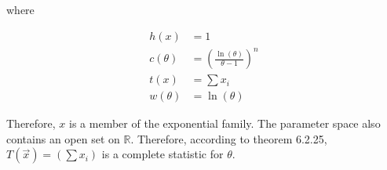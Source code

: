 where

\begin{align*}
	h(x) &= 1 \\
	c(\theta) &= \left( \frac{\ln(\theta)}{\theta-1} \right)^n \\
	t(x) &= \sum x_i \\
	w(\theta) &= \ln(\theta)
\end{align*}

Therefore, $x$ is a member of the exponential family. The parameter space also contains an open set on $\mathbb{R}$. Therefore, according to theorem 6.2.25, $T(\vec{x}) = (\sum x_i)$ is a complete statistic for $\theta$.
